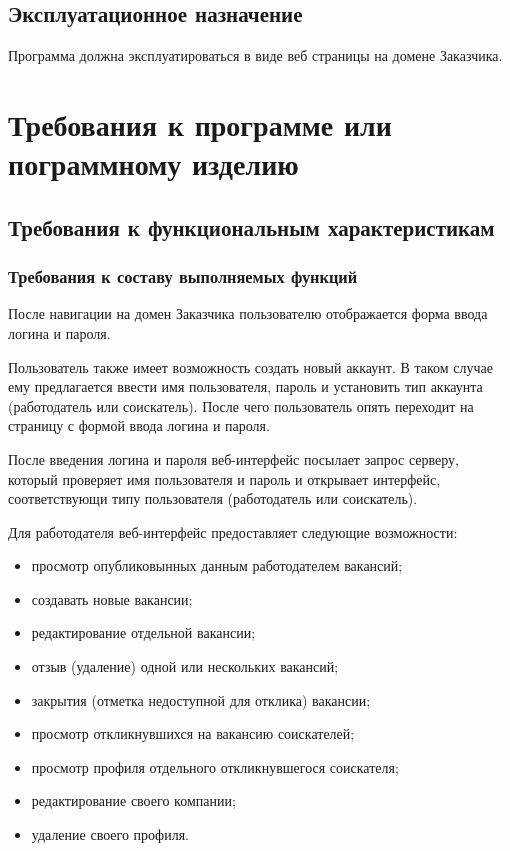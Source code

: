 \documentclass[a4page]{article}
\begin{document}
\subsection{Эксплуатационное назначение}

Программа должна эксплуатироваться в виде веб страницы на домене Заказчика.

\section{Требования к программе или пограммному изделию}

\subsection{Требования к функциональным характеристикам}

\subsubsection{Требования к составу выполняемых функций}

После навигации на домен Заказчика пользователю отображается форма ввода логина и пароля.

Пользователь также имеет возможность создать новый аккаунт. В таком случае ему предлагается ввести имя пользователя, пароль и установить тип аккаунта (работодатель или соискатель). После чего пользователь опять переходит на страницу с формой ввода логина и пароля.

После введения логина и пароля веб-интерфейс посылает запрос серверу, который проверяет имя пользователя и пароль и открывает интерфейс, соответствующи типу пользователя (работодатель или соискатель).

Для работодателя веб-интерфейс предоставляет следующие возможности:

\begin{itemize}
  \item просмотр опубликовынных данным работодателем вакансий;
  \item создавать новые вакансии;
  \item редактирование отдельной вакансии;
  \item отзыв (удаление) одной или нескольких вакансий;
  \item закрытия (отметка недоступной для отклика) вакансии;
  \item просмотр откликнувшихся на вакансию соискателей;
  \item просмотр профиля отдельного откликнувшегося соискателя;
  \item редактирование своего компании;
  \item удаление своего профиля.
\end{itemize}
\end{document}
